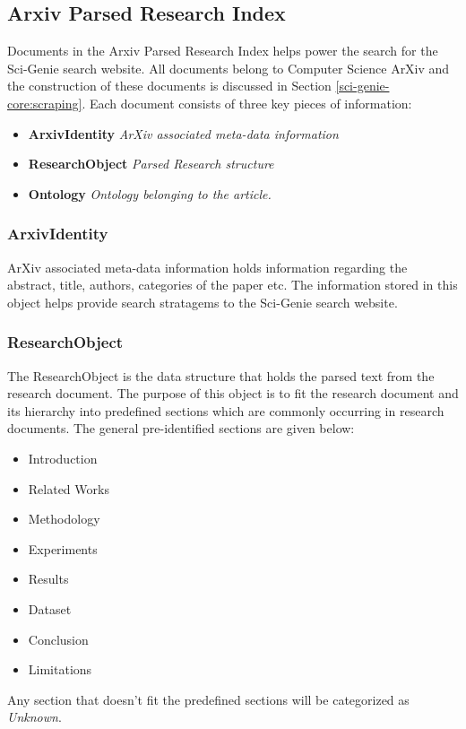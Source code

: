 \subsection{Arxiv Parsed Research Index}

Documents in the Arxiv Parsed Research Index helps power the search for the Sci-Genie search website. All documents belong to Computer Science ArXiv and 
the construction of these documents is discussed in Section \ref{sci-genie-core:scraping}. Each document consists of three 
key pieces of information:
\begin{itemize}
    \item \textbf{ArxivIdentity} \textit{ArXiv associated meta-data information}
    \item \textbf{ResearchObject} \textit{Parsed Research structure}
    \item \textbf{Ontology} \textit{Ontology belonging to the article.}
\end{itemize}

\subsubsection{ArxivIdentity}
ArXiv associated meta-data information holds information regarding the abstract, title, authors, categories of the paper etc. 
The information stored in this object helps provide search stratagems to the Sci-Genie search website. 

\subsubsection{ResearchObject}
\label{sci-genie-core:data-layer:researchobj}
The ResearchObject is the data structure that holds the parsed text from the research document. 
The purpose of this object is to fit the research document and its hierarchy into predefined sections
which are commonly occurring in research documents. The general pre-identified sections are given below:
\begin{itemize}
    \item Introduction
    \item Related Works
    \item Methodology
    \item Experiments
    \item Results
    \item Dataset
    \item Conclusion
    \item Limitations
\end{itemize} 
Any section that doesn't fit the predefined sections will be categorized as \textit{Unknown}. 

